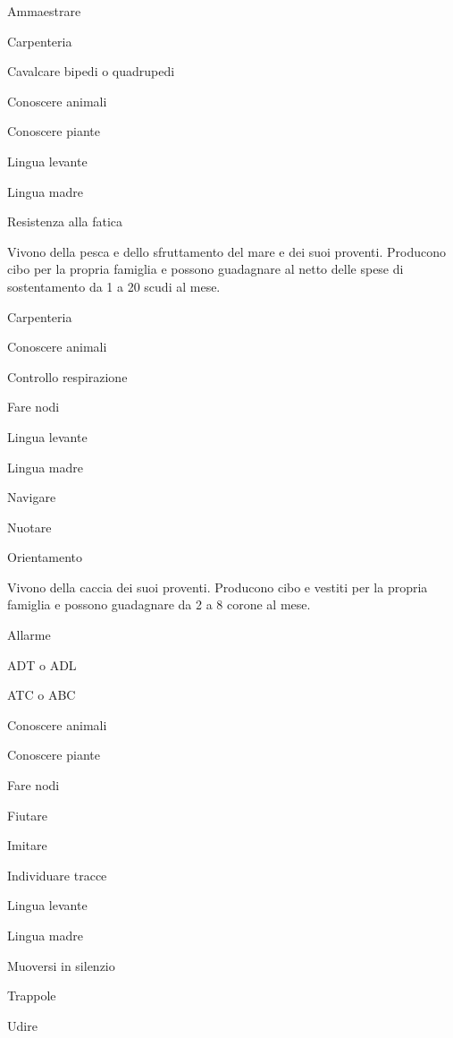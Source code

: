 \begin{abilist}
\item Ammaestrare
\item Carpenteria
\item Cavalcare bipedi o quadrupedi
\item Conoscere animali
\item Conoscere piante
\item Lingua levante
\item Lingua madre
\item Resistenza alla fatica
\end{abilist}


Vivono della pesca e dello sfruttamento del mare e dei suoi proventi.
Producono cibo per la propria famiglia e possono guadagnare al netto
delle spese di sostentamento da 1 a 20 scudi al mese.

\begin{abilist}
\item Carpenteria
\item Conoscere animali
\item Controllo respirazione
\item Fare nodi
\item Lingua levante
\item Lingua madre
\item Navigare
\item Nuotare
\item Orientamento
\end{abilist}


Vivono della caccia dei suoi proventi. Producono cibo e vestiti per la
propria famiglia e possono guadagnare da 2 a 8 corone al mese.

\begin{abilist}
\item Allarme
\item ADT o ADL
\item ATC o ABC
\item Conoscere animali
\item Conoscere piante
\item Fare nodi
\item Fiutare
\item Imitare
\item Individuare tracce
\item Lingua levante
\item Lingua madre
\item Muoversi in silenzio
\item Trappole
\item Udire
\end{abilist}

